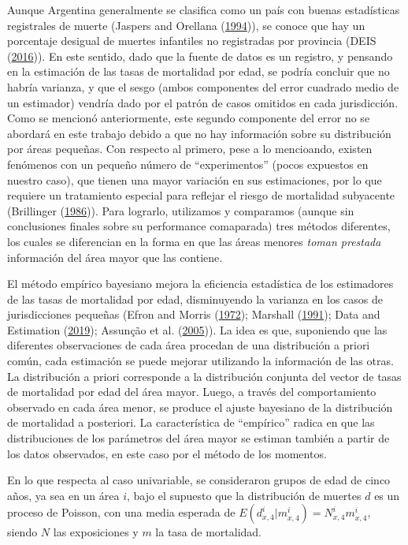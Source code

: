 \documentclass[12pt,]{article}
\begin{document}
Aunque Argentina generalmente se clasifica como un país con buenas
estadísticas registrales de muerte (Jaspers and Orellana
(\protect\hyperlink{ref-JaspersOrellana1994}{1994})), se conoce que hay
un porcentaje desigual de muertes infantiles no registradas por
provincia (DEIS (\protect\hyperlink{ref-DEIS2016}{2016})). En este
sentido, dado que la fuente de datos es un registro, y pensando en la
estimación de las tasas de mortalidad por edad, se podría concluir que
no habría varianza, y que el sesgo (ambos componentes del error cuadrado
medio de un estimador) vendría dado por el patrón de casos omitidos en
cada jurisdicción. Como se mencionó anteriormente, este segundo
componente del error no se abordará en este trabajo debido a que no hay
información sobre su distribución por áreas pequeñas. Con respecto al
primero, pese a lo mencioando, existen fenómenos con un pequeño número
de ``experimentos'' (pocos expuestos en nuestro caso), que tienen una
mayor variación en sus estimaciones, por lo que requiere un tratamiento
especial para reflejar el riesgo de mortalidad subyacente (Brillinger
(\protect\hyperlink{ref-Brillinger1986}{1986})). Para lograrlo,
utilizamos y comparamos (aunque sin conclusiones finales sobre su
performance comaparada) tres métodos diferentes, los cuales se
diferencian en la forma en que las áreas menores \emph{toman prestada}
información del área mayor que las contiene.

El método empírico bayesiano mejora la eficiencia estadística de los
estimadores de las tasas de mortalidad por edad, disminuyendo la
varianza en los casos de jurisdicciones pequeñas (Efron and Morris
(\protect\hyperlink{ref-Efron1972}{1972}); Marshall
(\protect\hyperlink{ref-Marshall1991}{1991}); Data and Estimation
(\protect\hyperlink{ref-Longford2005}{2019}); Assunção et al.
(\protect\hyperlink{ref-Assuncao2005}{2005})). La idea es que,
suponiendo que las diferentes observaciones de cada área procedan de una
distribución a priori común, cada estimación se puede mejorar utilizando
la información de las otras. La distribución a priori corresponde a la
distribución conjunta del vector de tasas de mortalidad por edad del
área mayor. Luego, a través del comportamiento observado en cada área
menor, se produce el ajuste bayesiano de la distribución de mortalidad a
posteriori. La característica de ``empírico'' radica en que las
distribuciones de los parámetros del área mayor se estiman también a
partir de los datos observados, en este caso por el método de los
momentos.

En lo que respecta al caso univariable, se consideraron grupos de edad
de cinco años, ya sea en un área \(i\), bajo el supuesto que la
distribución de muertes \(d\) es un proceso de Poisson, con una media
esperada de \(E(d_ {x,4}^{i}|{m_{x,4}^{i}})=N_{x,4}^{i}m_{x,4}^{i}\),
siendo \(N\) las exposiciones y \(m\) la tasa de mortalidad.
\end{document}
